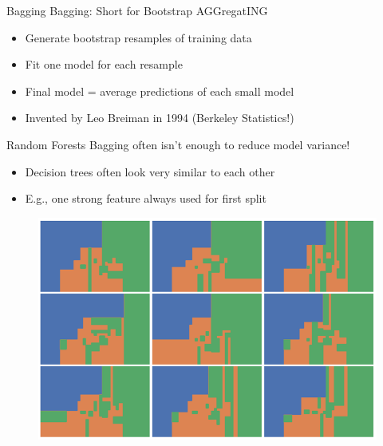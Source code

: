 \documentclass[aspectratio=169]{../latex_main/tntbeamer}  %
\begin{document}
	
	
	\begin{frame}{Bagging}
	    Bagging: Short for Bootstrap AGGregatING
	    \begin{itemize}
	        \item Generate bootstrap resamples of training data
	        \item Fit one model for each resample
	        \item Final model = average predictions of each small model
	        \item Invented by Leo Breiman in 1994 (Berkeley Statistics!)
	    \end{itemize}

	\end{frame}
	
	\begin{frame}{Random Forests}
	    Bagging often isn’t enough to reduce model variance!
	    \begin{itemize}
	        \item Decision trees often look very similar to each other
	        \item E.g., one strong feature always used for first split
	    \end{itemize}
	    
	    \begin{figure}
	        \centering
	        \includegraphics[scale=.4]{Bild57}
	    \end{figure}
	\end{frame}
	
\end{document}
